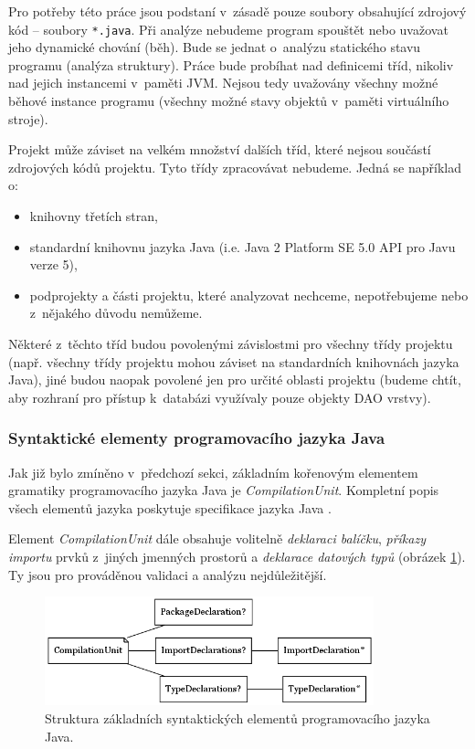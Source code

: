 Pro potřeby této práce jsou podstaní v~zásadě pouze soubory obsahující zdrojový kód -- soubory \verb+*.java+. Při analýze nebudeme program spouštět nebo uvažovat jeho dynamické chování (běh). Bude se jednat o~analýzu statického stavu programu (analýza struktury). Práce bude probíhat nad definicemi tříd, nikoliv nad jejich instancemi v~paměti JVM. Nejsou tedy uvažovány všechny možné běhové instance programu (všechny možné stavy objektů v~paměti virtuálního stroje).

Projekt může záviset na velkém množství dalších tříd, které nejsou součástí zdrojových kódů projektu. Tyto třídy zpracovávat nebudeme. Jedná se například o:

\begin{itemize}
\item knihovny třetích stran,
\item standardní knihovnu jazyka Java (i.e. Java 2 Platform SE 5.0 API pro Javu verze 5),
\item podprojekty a části projektu, které analyzovat nechceme, nepotřebujeme nebo z~nějakého důvodu nemůžeme.
\end{itemize}

Některé z~těchto tříd budou povolenými závislostmi pro všechny třídy projektu (např. všechny třídy projektu mohou záviset na standardních knihovnách jazyka Java), jiné budou naopak povolené jen pro určité oblasti projektu (budeme chtít, aby rozhraní pro přístup k~databázi využívaly pouze objekty DAO vrstvy).

\subsubsection{Syntaktické elementy programovacího jazyka Java}
\label{analysis-java_grammar_elements}
Jak již bylo zmíněno v~předchozí sekci, základním kořenovým elementem gramatiky programovacího jazyka Java je \emph{CompilationUnit}. Kompletní popis všech elementů jazyka poskytuje specifikace jazyka Java \cite{Gosling:2005:JLS:1036643}.

Element \emph{CompilationUnit} dále obsahuje volitelně \emph{deklaraci balíčku}, \emph{příkazy importu} prvků z~jiných jmenných prostorů a \emph{deklarace datových typů} (obrázek \ref{toplevel_elements}). Ty jsou pro prováděnou validaci a analýzu nejdůležitější.

\begin{figure}[h!]
  \centering
  \includegraphics[width=0.85\textwidth]{./graphs/java_top_elements.png}
  \caption{Struktura základních syntaktických elementů programovacího jazyka Java.\label{toplevel_elements}}
\end{figure}

